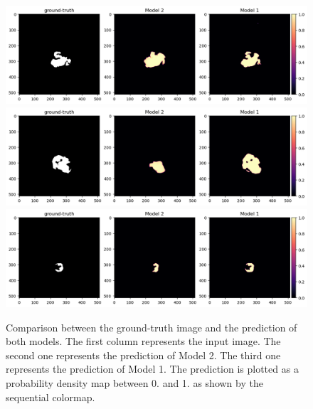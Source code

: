 \documentclass{standalone}
\begin{document}
\begin{figure}[htp]

    \centering
    \includegraphics[width=\textwidth]{../images/predcomparison.png}
    \includegraphics[width=\textwidth]{../images/predcomparison1.png}
    \includegraphics[width=\textwidth]{../images/predcomparison2.png}
    

    \caption{Comparison between the ground-truth image and the prediction of both models. 
    The first column represents the input image. 
    The second one represents the prediction of Model 2. 
    The third one represents the prediction of Model 1.
    The prediction is plotted as a probability density map between 0. and 1. as shown by the sequential colormap.}\label{predcomparison}

\end{figure}
\end{document}
